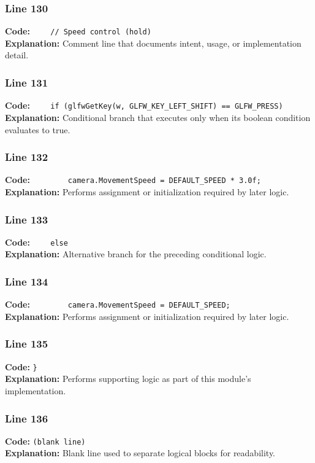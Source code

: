 \documentclass[11pt,a4paper]{article}
\begin{document}
\subsubsection*{Line 130}
\textbf{Code:} \verb|    // Speed control (hold)|\\
\textbf{Explanation:} Comment line that documents intent, usage, or implementation detail.

\subsubsection*{Line 131}
\textbf{Code:} \verb|    if (glfwGetKey(w, GLFW_KEY_LEFT_SHIFT) == GLFW_PRESS)|\\
\textbf{Explanation:} Conditional branch that executes only when its boolean condition evaluates to true.

\subsubsection*{Line 132}
\textbf{Code:} \verb|        camera.MovementSpeed = DEFAULT_SPEED * 3.0f;|\\
\textbf{Explanation:} Performs assignment or initialization required by later logic.

\subsubsection*{Line 133}
\textbf{Code:} \verb|    else|\\
\textbf{Explanation:} Alternative branch for the preceding conditional logic.

\subsubsection*{Line 134}
\textbf{Code:} \verb|        camera.MovementSpeed = DEFAULT_SPEED;|\\
\textbf{Explanation:} Performs assignment or initialization required by later logic.

\subsubsection*{Line 135}
\textbf{Code:} \verb|}|\\
\textbf{Explanation:} Performs supporting logic as part of this module's implementation.

\subsubsection*{Line 136}
\textbf{Code:} \texttt{(blank line)}\\
\textbf{Explanation:} Blank line used to separate logical blocks for readability.
\end{document}
